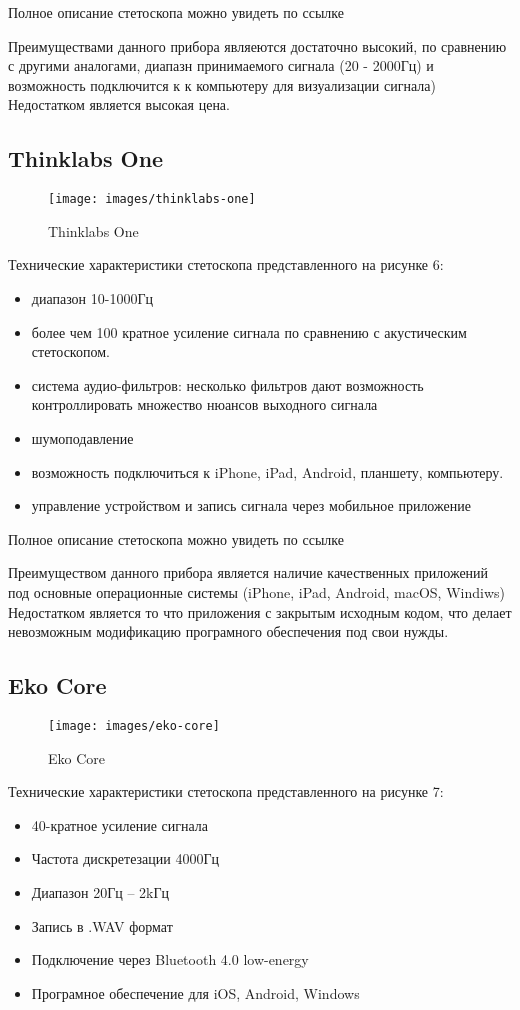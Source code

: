 \documentclass[../main.tex]{subfiles}
\begin{document}
Полное описание стетоскопа можно увидеть по ссылке \cite{cardioics}

Преимуществами данного прибора являеются достаточно высокий, по сравнению с другими аналогами, диапазн принимаемого сигнала (20 - 2000Гц) и возможность подключится к к компьютеру для визуализации сигнала) Недостатком является высокая цена.

\subsection{Thinklabs One}
\begin{figure}[H]
\centering
\texttt{[image: images/thinklabs-one]}
\caption{Thinklabs One}
\end{figure}

Технические характеристики стетоскопа представленного на рисунке 6:
\begin{itemize}
  \item диапазон 10-1000Гц
  \item более чем 100 кратное усиление сигнала по сравнению с акустическим стетоскопом.
  \item система аудио-фильтров: несколько фильтров дают возможность контроллировать множество нюансов выходного сигнала
  \item шумоподавление
  \item возможность подключиться к iPhone, iPad, Android, планшету, компьютеру.
  \item управление устройством и запись сигнала через мобильное приложение
\end{itemize}

Полное описание стетоскопа можно увидеть по ссылке \cite{thinklabs-one}

Преимуществом данного прибора является наличие качественных приложений под основные операционные системы (iPhone, iPad, Android, macOS, Windiws) Недостатком является то что приложения с закрытым исходным кодом, что делает невозможным модификацию програмного обеспечения под свои нужды.

\subsection{Eko Core}
\begin{figure}[H]
\centering
\texttt{[image: images/eko-core]}
\caption{Eko Core}
\end{figure}

Технические характеристики  стетоскопа представленного на рисунке 7:
\begin{itemize}
  \item 40-кратное усиление сигнала
  \item Частота дискретезации 4000Гц
  \item Диапазон 20Гц – 2kГц
  \item Запись в .WAV формат
  \item Подключение через Bluetooth 4.0 low-energy
  \item Програмное обеспечение для iOS, Android, Windows
\end{itemize}
\end{document}
